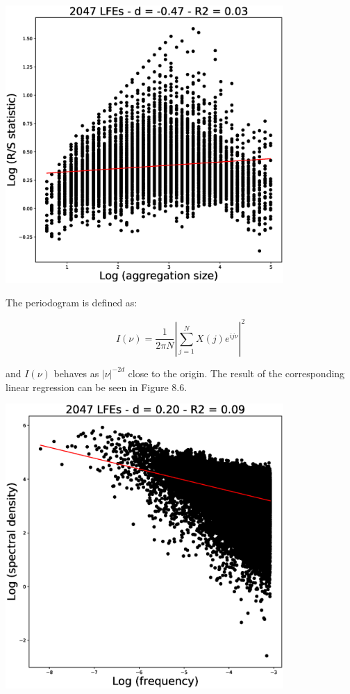 \documentclass[workdone.tex]{subfiles}
\begin{document}
\begin{center}
\includegraphics[width=300pt, trim={0cm 0cm 0cm 0cm},clip]{Figures/longrange/RS.eps}
\captionsetup{type=figure}
\end{center}

The periodogram  is defined as:

\begin{equation}
I \left( \nu \right) = \frac{1}{2 \pi N} \left| \sum_{j = 1}^N X \left( j \right) e^{i j \nu} \right| ^2
\end{equation}

and $I \left( \nu \right)$ behaves as $\left| \nu \right| ^{- 2 d}$ close to the origin. The result of the corresponding linear regression can be seen in Figure 8.6.

\begin{center}
\includegraphics[width=300pt, trim={0cm 0cm 0cm 0cm},clip]{Figures/longrange/periodogram.eps}
\captionsetup{type=figure}
\end{center}
\end{document}
